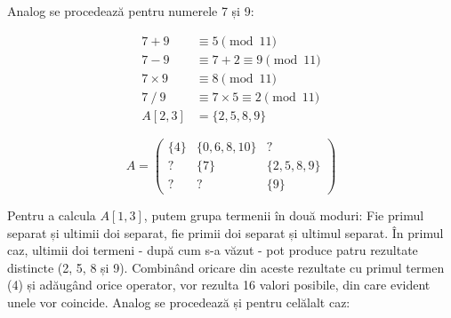 Analog se procedează pentru numerele 7 și 9:

\begin{align*}
  7 + 9 & \equiv 5 \pmod{11} \\
  7 - 9 & \equiv 7 + 2 \equiv 9 \pmod{11} \\
  7 \times 9 & \equiv 8 \pmod{11} \\
  7\ /\ 9 & \equiv 7 \times 5 \equiv 2 \pmod{11} \\
  A[2,3] & = \{2, 5, 8, 9\}
\end{align*}

\begin{equation}
  A =
  \begin{pmatrix}
    \{4\} & \{0, 6, 8, 10\} & ? \\
    ? & \{7\} & \{2, 5, 8, 9\} \\
    ? & ? & \{9\}
  \end{pmatrix}
\end{equation}

Pentru a calcula $A[1,3]$, putem grupa termenii în două moduri: Fie primul
separat și ultimii doi separat, fie primii doi separat și ultimul separat. În
primul caz, ultimii doi termeni - după cum s-a văzut - pot produce patru
rezultate distincte (2, 5, 8 și 9). Combinând oricare din aceste rezultate cu
primul termen (4) și adăugând orice operator, vor rezulta 16 valori posibile,
din care evident unele vor coincide. Analog se procedează și pentru celălalt
caz:

